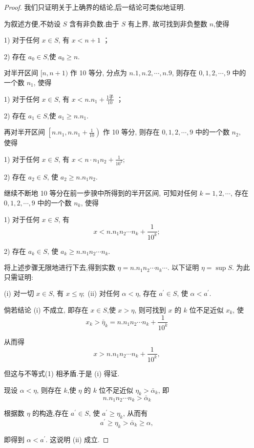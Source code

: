 \begin{proof}
	我们只证明关于上确界的结论,后一结论可类似地证明.

	为叙述方便,不妨设 $S$ 含有非负数.由于 $S$ 有上界, 故可找到非负整数 $n$,使得

	1) 对于任何 $x \in S$, 有 $x<n+1$ ；

	2) 存在 $a_{0} \in S$,使 $a_{0} \geqslant n$.

	对半开区间 $[n, n+1)$ 作 10 等分, 分点为 $n .1, n .2, \cdots, n .9$, 则存在 $0,1,2, \cdots, 9$ 中的一个数 $n_{1}$, 使得

	1) 对于任何 $x \in S$, 有 $x<n.n_1+\frac{1子}{10}$ ；

	2) 存在 $a_{1} \in S$,使 $a_{1} \geqslant n . n_{1}$.

	再对半开区间 $\left[n.n_{1}, n . n_{1}+\frac{1}{10}\right) $  作  10  等分, 则存在 $ 0,1,2, \cdots, 9 $ 中的一个数 $ n_{2}, $ 使得

	1) 对于任何 $x \in S$, 有 $x<n \cdot n_{1} n_{2}+\frac{1}{10^{2}}$;

	2) 存在 $a_{2} \in S$, 使 $a_{2} \geqslant n.n_{1} n_{2}$.

	继续不断地 10 等分在前一步骙中所得到的半开区间, 可知对任何 $k=1,2, \cdots$, 存在 $0,1,2, \cdots, 9$ 中的一个数 $n_{k}$, 使得

	1) 对于任何 $ x \in S $, 有 \[ x<n.n_{1} n_{2} \cdots n_{k}+\frac{1}{10^{k}} ;\tag{1}\]

	2) 存在 $a_{k} \in S$, 使 $a_{k} \geqslant n . n_{1} n_{2} \cdots n_{k}$.

	将上述步骤无限地进行下去,得到实数 $\eta=n.n_{1} n_{2} \cdots n_{k} \cdots .$ 以下证明 $\eta=\sup S$. 为此只需证明:

	(i) 对一切 $x \in S$, 有 $x \leqslant \eta ;$ (ii) 对任何 $\alpha<\eta$, 存在 $a^{\prime} \in S$, 使 $\alpha<a^{\prime}$.

	倘若结论 (i) 不成立, 即存在 $x \in S$,使 $x>\eta$, 则可找到 $x$ 的 $k$ 位不足近似 $x_{k}$, 使
	\[
	x_{k}>\bar{\eta}_{k}=n.n_{1} n_{2} \cdots n_{k}+\frac{1}{10^{k}}
	\]

	从而得
	\[
	x>n.n_{1} n_{2} \cdots n_{k}+\frac{1}{10^{k}},
	\]

	但这与不等式(1) 相矛盾.于是 (i) 得证.

	现设 $\alpha<\eta$, 则存在 $k$,使 $\eta$ 的 $k$ 位不足近似 $\eta_{k}>\bar{\alpha}_{k}$, 即
	\[
	n.n_{1} n_{2} \cdots n_{k}>\bar{\alpha}_{k}
	\]

	根据数 $\eta$ 的构造,存在 $a^{\prime} \in S$, 使 $a^{\prime} \geqslant \eta_{k}$, 从而有
	\[
	a^{\prime} \geqslant \eta_{k}>\bar{\alpha}_{k} \geqslant \alpha,
	\]

	即得到 $\alpha<a^{\prime}$. 这说明 (ii) 成立.
\end{proof}


